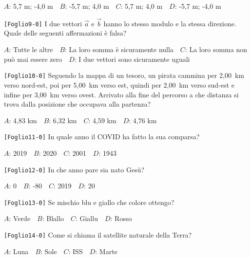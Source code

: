 {$A$}: 5,7 m; -4,0 m\ \ 
{$B$}: -5,7 m; 4,0 m\ \ 
{$C$}: 5,7 m; 4,0 m\ \ 
{$D$}: -5,7 m; -4,0 m\ \ 


\noindent
{\tt [{Foglio9-0}]} I due vettori $\vec{a}$ e $\vec{b}$ hanno lo stesso modulo e la stessa direzione. Quale delle seguenti affermazioni è falsa?

{$A$}: Tutte le altre\ \ 
{$B$}: La loro somma è sicuramente nulla\ \ 
{$C$}: La loro somma non può mai essere zero\ \ 
{$D$}: I due vettori sono sicuramente uguali\ \ 


\noindent
{\tt [{Foglio10-0}]} Seguendo la mappa di un tesoro, un pirata cammina per 2,00~km verso nord-est, poi per 5,00~km verso est, quindi per 2,00~km verso sud-est e infine per 3,00~km verso ovest. Arrivato alla fine del percorso a che distanza si trova dalla posizione che occupava alla partenza?

{$A$}: 4,83 km\ \ 
{$B$}: 6,32 km\ \ 
{$C$}: 4,59 km\ \ 
{$D$}: 4,76 km\ \ 


\noindent
{\tt [{Foglio11-0}]} In quale anno il COVID ha fatto la sua comparsa?

{$A$}: 2019\ \ 
{$B$}: 2020\ \ 
{$C$}: 2001\ \ 
{$D$}: 1943\ \ 


\noindent
{\tt [{Foglio12-0}]} In che anno pare sia nato Gesù?

{$A$}: 0\ \ 
{$B$}: -80\ \ 
{$C$}: 2019\ \ 
{$D$}: 20\ \ 


\noindent
{\tt [{Foglio13-0}]} Se mischio blu e giallo che colore ottengo?

{$A$}: Verde\ \ 
{$B$}: Blallo\ \ 
{$C$}: Giallu\ \ 
{$D$}: Rosso\ \ 


\noindent
{\tt [{Foglio14-0}]} Come si chiama il satellite naturale della Terra?

{$A$}: Luna\ \ 
{$B$}: Sole\ \ 
{$C$}: ISS\ \ 
{$D$}: Marte\ \ 
